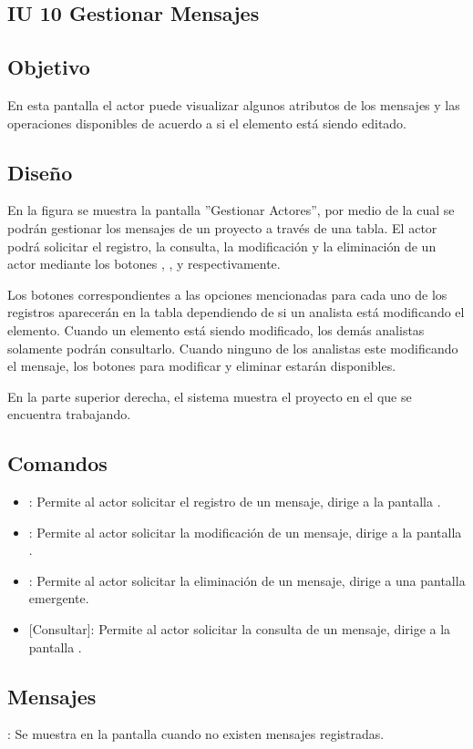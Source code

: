 \subsection{IU 10 Gestionar Mensajes}

\subsection{Objetivo}
	En esta pantalla el actor puede visualizar algunos atributos de los mensajes y las operaciones disponibles de acuerdo a si el elemento está siendo editado.
\subsection{Diseño}
	En la figura  se muestra la pantalla ''Gestionar Actores'', por medio de la cual se podrán gestionar los mensajes de un proyecto a través de una tabla. El actor podrá solicitar el registro, la consulta, la modificación y la eliminación de un actor mediante los botones , , \editar y \eliminar respectivamente.
	
	Los botones correspondientes a las opciones mencionadas para cada uno de los registros aparecerán en la tabla dependiendo de si un analista está modificando el elemento. Cuando un elemento está siendo modificado, los demás analistas solamente podrán consultarlo. Cuando ninguno de los analistas este modificando el mensaje, los botones para modificar y eliminar
	estarán disponibles.
	
	En la parte superior derecha, el sistema muestra el proyecto en el que se encuentra trabajando.

\subsection{Comandos}
\begin{itemize}
	\item {}: Permite al actor solicitar el registro de un mensaje, dirige a la pantalla .
	\item \editar [Modificar]: Permite al actor solicitar la modificación de un mensaje, dirige a la pantalla .
	\item \eliminar [Eliminar]: Permite al actor solicitar la eliminación de un mensaje, dirige a una pantalla emergente.
	\item {} [Consultar]: Permite al actor solicitar la consulta de un mensaje, dirige a la pantalla  .
\end{itemize}
\subsection{Mensajes}

\begin{Citemize}
	\item {}: Se muestra en la pantalla  cuando no existen mensajes registradas.
\end{Citemize}
